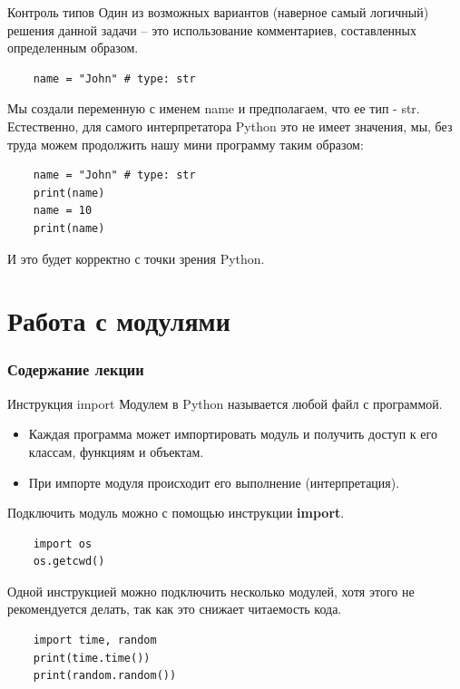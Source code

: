 \documentclass[xcolor=table]{beamer}
\begin{document}
\begin{frame}[fragile]{Контроль типов}
	Один из возможных вариантов (наверное самый логичный) решения данной задачи -- это использование
комментариев, составленных определенным образом. 

	\begin{verbatim}
	name = "John" # type: str
	\end{verbatim}
	
	Мы создали переменную с именем name и предполагаем, что ее тип - str. Естественно, для самого интерпретатора Python это не имеет значения, мы, без труда можем продолжить нашу мини программу таким образом:
	\begin{verbatim}
	name = "John" # type: str
	print(name)
	name = 10
	print(name)	
	\end{verbatim}
	И это будет корректно с точки зрения Python.
\end{frame}

\section{Работа с модулями}

\begin{frame}
  \frametitle{Содержание лекции}
  \tableofcontents[current]
\end{frame}

\begin{frame}[fragile]{Инструкция import}
	Модулем в Python называется любой файл с программой. 	

	\begin{itemize}
		\item Каждая программа может импортировать модуль и получить доступ к его классам, функциям и объектам. 	
		\item При импорте модуля происходит его выполнение (интерпретация).
	\end{itemize}	
	
	Подключить модуль можно с помощью инструкции \textbf{import}.
	\begin{verbatim}
	import os
	os.getcwd()
	\end{verbatim}
	
	Одной инструкцией можно подключить несколько модулей, хотя этого не рекомендуется делать, так как это снижает читаемость кода. 
	\begin{verbatim}
	import time, random
	print(time.time())
	print(random.random())
	\end{verbatim}
\end{frame}
\end{document}
